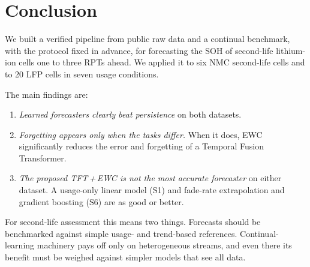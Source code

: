 \section{Conclusion}
\label{sec:conclusion}

We built a verified pipeline from public raw data and a continual benchmark, with the protocol fixed in advance, for forecasting the SOH of second-life lithium-ion cells one to three RPTs ahead. We applied it to six NMC second-life cells and to 20 LFP cells in seven usage conditions.

The main findings are:
\begin{enumerate}
  \item \emph{Learned forecasters clearly beat persistence} on both datasets.
  \item \emph{Forgetting appears only when the tasks differ.} When it does, EWC significantly reduces the error and forgetting of a Temporal Fusion Transformer.
  \item \emph{The proposed TFT\,+\,EWC is not the most accurate forecaster} on either dataset. A usage-only linear model (S1) and fade-rate extrapolation and gradient boosting (S6) are as good or better.
\end{enumerate}

For second-life assessment this means two things. Forecasts should be benchmarked against simple usage- and trend-based references. Continual-learning machinery pays off only on heterogeneous streams, and even there its benefit must be weighed against simpler models that see all data.
